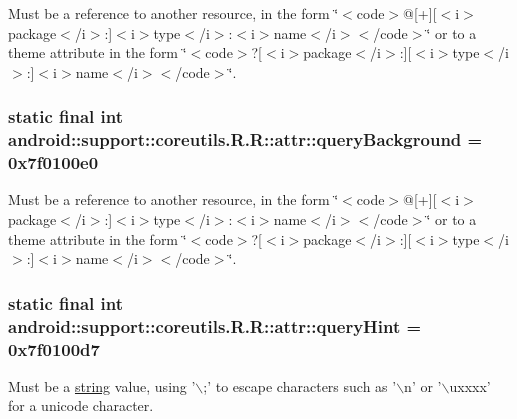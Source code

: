 Must be a reference to another resource, in the form \char`\"{}$<$code$>$@\mbox{[}+\mbox{]}\mbox{[}$<$i$>$package$<$/i$>$:\mbox{]}$<$i$>$type$<$/i$>$:$<$i$>$name$<$/i$>$$<$/code$>$\char`\"{} or to a theme attribute in the form \char`\"{}$<$code$>$?\mbox{[}$<$i$>$package$<$/i$>$:\mbox{]}\mbox{[}$<$i$>$type$<$/i$>$:\mbox{]}$<$i$>$name$<$/i$>$$<$/code$>$\char`\"{}. \hypertarget{classandroid_1_1support_1_1coreutils_1_1_r_1_1attr_0f61ffeb4925e3804af58e22c73a491b}{
\subsubsection[{queryBackground}]{\setlength{\rightskip}{0pt plus 5cm}static final int android::support::coreutils.R.R::attr::queryBackground = 0x7f0100e0}}
\label{classandroid_1_1support_1_1coreutils_1_1_r_1_1attr_0f61ffeb4925e3804af58e22c73a491b}


Must be a reference to another resource, in the form \char`\"{}$<$code$>$@\mbox{[}+\mbox{]}\mbox{[}$<$i$>$package$<$/i$>$:\mbox{]}$<$i$>$type$<$/i$>$:$<$i$>$name$<$/i$>$$<$/code$>$\char`\"{} or to a theme attribute in the form \char`\"{}$<$code$>$?\mbox{[}$<$i$>$package$<$/i$>$:\mbox{]}\mbox{[}$<$i$>$type$<$/i$>$:\mbox{]}$<$i$>$name$<$/i$>$$<$/code$>$\char`\"{}. \hypertarget{classandroid_1_1support_1_1coreutils_1_1_r_1_1attr_fa0edd1787f5ff90be88af42c1a7f5ca}{
\subsubsection[{queryHint}]{\setlength{\rightskip}{0pt plus 5cm}static final int android::support::coreutils.R.R::attr::queryHint = 0x7f0100d7}}
\label{classandroid_1_1support_1_1coreutils_1_1_r_1_1attr_fa0edd1787f5ff90be88af42c1a7f5ca}


Must be a \hyperlink{classandroid_1_1support_1_1coreutils_1_1_r_1_1string}{string} value, using '$\backslash$;' to escape characters such as '$\backslash$n' or '$\backslash$uxxxx' for a unicode character. 

